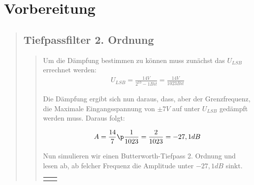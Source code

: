 \section{Vorbereitung}
\begin{quote}
    
    \subsection{Tiefpassfilter 2. Ordnung}
    \begin{quote}
        
        Um die Dämpfung bestimmen zu können muss zunächst das $U_{LSB}$ errechnet werden:
        \begin{equation}
    	\begin{split}
    		U_{LSB} = \frac{14V}{2^{10} - 1 Bit} = \frac{14V}{1023 Bit}
    	\end{split}
        \end{equation}
        
        Die Dämpfung ergibt sich nun daraus, dass, aber der Grenzfrequenz, die Maximale Eingangsspannung von $\pm 7V$ auf unter $U_{LSB}$ gedämpft
        werden muss.
        Daraus folgt:
        
        
        \begin{equation}
    	\begin{split}
    		A = \frac{14}{7} \p \frac{1}{1023} = \frac{2}{1023} = -27,1 dB
    	\end{split}
        \end{equation}
        
        
        Nun simulieren wir einen Butterworth-Tiefpass 2. Ordnung und lesen ab, ab felcher Frequenz die Amplitude unter $-27,1 dB$ sinkt.
        
        \begin{center}
        \vspace{-1.5cm}
        \begin{tabular}{ll}
        
        \hspace{-4.5cm}
            \begin{minipage}{0.6\textwidth}
                

\end{minipage}
\end{tabular}
\end{center}
\end{quote}
\end{quote}
